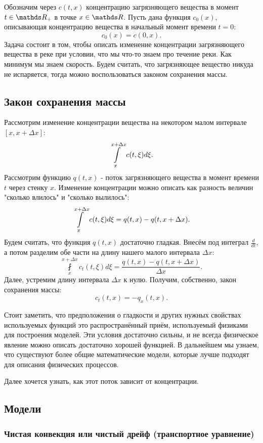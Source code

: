 Обозначим через $c (t, x) $ концентрацию загрязняющего вещества в момент $t \in \real_+$ в точке $x \in \real$. Пусть дана функция $ c_0 (x) $, описывающая концентрацию вещества в начальный момент времени $ t = 0 $:
$$ c_0 (x) = c (0, x).$$
Задача состоит в том, чтобы описать изменение концентрации загрязняющего вещества в реке при условии, что мы что-то знаем про течение реки. Как минимум мы знаем скорость. Будем считать, что загрязняющее вещество никуда не испаряется, тогда можно воспользоваться законом сохранения массы.

\subsection{Закон сохранения массы}

Рассмотрим изменение концентрации вещества на некотором малом интервале $ [x, x + \Delta x] $:
$$ \displaystyle \int \limits_x^{x + \Delta x} c (t, \xi) d \xi .$$
Рассмотрим функцию $ q (t, x) $ - поток загрязняющего вещества в момент времени $t$ через стенку $x$. Изменение концентрации можно описать как разность величин "сколько влилось" и "сколько вылилось": 
$$ \displaystyle \int \limits_x^{x + \Delta x} c (t, \xi) d \xi = q (t, x) - q (t, x + \Delta x). $$
Будем считать, что функция $q (t, x) $ достаточно гладкая. Внесём под интеграл $ \displaystyle \frac {d} {dt} $, а потом разделим обе части на длину нашего малого интервала $ \Delta x$:
$$ \fint \limits_x^{x + \Delta x} c_t (t, \xi) d \xi  = \frac {q  (t, x) - q (t, x + \Delta x)} {\Delta x}.$$
Далее, устремим длину интервала $\Delta x$ к нулю. Получим, собственно, закон сохранения массы:
$$ c_t (t, x) = -q_x (t, x). $$

Стоит заметить, что предположения о гладкости и других нужных свойствах используемых функций это распространённый приём, используемый физиками для построения моделей. Эти условия достаточно сильны, и не всегда физическое явление можно описать достаточно хорошей функцией. В дальнейшем мы узнаем, что существуют более общие математические модели, которые лучше подходят для описания физических процессов.


Далее хочется узнать, как этот поток зависит от концентрации.

\subsection{Модели}
\subsubsection*{Чистая конвекция или чистый дрейф (транспортное уравнение)}

